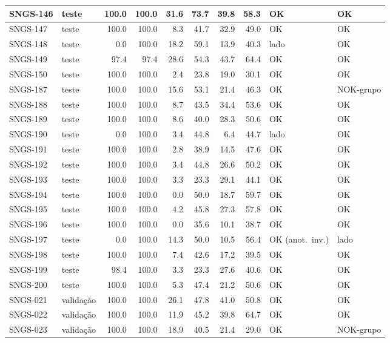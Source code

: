 \begin{small}
\begin{longtable}{|l|l|r|r|r|r|r|r|l|l|}
SNGS-146 & teste & 100.0 & 100.0 & 31.6 & 73.7 & 39.8 & 58.3 & OK & OK \\ \hline
SNGS-147 & teste & 100.0 & 100.0 & 8.3 & 41.7 & 32.9 & 49.0 & OK & OK \\ \hline
SNGS-148 & teste & 0.0 & 100.0 & 18.2 & 59.1 & 13.9 & 40.3 & lado & OK \\ \hline
SNGS-149 & teste & 97.4 & 97.4 & 28.6 & 54.3 & 43.7 & 64.4 & OK & OK \\ \hline
SNGS-150 & teste & 100.0 & 100.0 & 2.4 & 23.8 & 19.0 & 30.1 & OK & OK \\ \hline
SNGS-187 & teste & 100.0 & 100.0 & 15.6 & 53.1 & 21.4 & 46.3 & OK & NOK-grupo \\ \hline
SNGS-188 & teste & 100.0 & 100.0 & 8.7 & 43.5 & 34.4 & 53.6 & OK & OK \\ \hline
SNGS-189 & teste & 100.0 & 100.0 & 8.6 & 40.0 & 28.3 & 50.6 & OK & OK \\ \hline
SNGS-190 & teste & 0.0 & 100.0 & 3.4 & 44.8 & 6.4 & 44.7 & lado & OK \\ \hline
SNGS-191 & teste & 100.0 & 100.0 & 2.8 & 38.9 & 14.5 & 47.6 & OK & OK \\ \hline
SNGS-192 & teste & 100.0 & 100.0 & 3.4 & 44.8 & 26.6 & 50.2 & OK & OK \\ \hline
SNGS-193 & teste & 100.0 & 100.0 & 3.3 & 23.3 & 29.1 & 44.1 & OK & OK \\ \hline
SNGS-194 & teste & 100.0 & 100.0 & 0.0 & 50.0 & 18.7 & 59.7 & OK & OK \\ \hline
SNGS-195 & teste & 100.0 & 100.0 & 4.2 & 45.8 & 27.3 & 57.8 & OK & OK \\ \hline
SNGS-196 & teste & 100.0 & 100.0 & 0.0 & 35.6 & 10.1 & 38.7 & OK & OK \\ \hline
SNGS-197 & teste & 0.0 & 100.0 & 14.3 & 50.0 & 10.5 & 56.4 & OK (anot.\ inv.) & lado \\ \hline
SNGS-198 & teste & 100.0 & 100.0 & 7.4 & 42.6 & 17.2 & 39.5 & OK & OK \\ \hline
SNGS-199 & teste & 98.4 & 100.0 & 3.3 & 23.3 & 27.6 & 40.6 & OK & OK \\ \hline
SNGS-200 & teste & 100.0 & 100.0 & 5.3 & 47.4 & 21.2 & 50.6 & OK & OK \\ \hline
SNGS-021 & validação & 100.0 & 100.0 & 26.1 & 47.8 & 41.0 & 50.8 & OK & OK \\ \hline
SNGS-022 & validação & 100.0 & 100.0 & 11.9 & 45.2 & 39.8 & 64.7 & OK & OK \\ \hline
SNGS-023 & validação & 100.0 & 100.0 & 18.9 & 40.5 & 21.4 & 29.0 & OK & NOK-grupo \\ \hline

\end{longtable}
\end{small}
